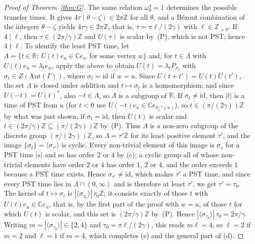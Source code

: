 \documentclass[preprint,11pt]{elsarticle}
\theoremstyle{definition}
\theoremstyle{remark}
\newcommand{\Z}{\mathbb Z}
\begin{document}
\begin{proof}[Proof of Theorem~\ref{thm:G}]
The same relation $\omega_\theta^4=1$ determines the possible transfer times. It gives $4\tau(\theta-\zeta)\in2\pi\Z$ for all $\theta$, and a B\'ezout combination of the integers $\theta-\zeta$ yields $4\tau\gamma\in2\pi\Z$, that is, $\tau=\pi\ell/(2\gamma)$ with $\ell\in\Z_{>0}$. If $4\mid\ell$, then $\tau\in(2\pi/\gamma)\Z$ and $U(\tau)$ is scalar by~(P), which is not PST; hence $4\nmid\ell$. To identify the least PST time, let $\Lambda=\{t\in\mathbb R:\ U(t)e_u\in\mathbb Ce_w\text{ for some vertex }w\}$ and, for $t\in\Lambda$ with $U(t)e_u=\lambda_te_w$, apply the above to obtain $U(t)=\lambda_tP_{\sigma_t}$ with $\sigma_t\in Z(\mathrm{Aut}(\Gamma))$, where $\sigma_t=\mathrm{id}$ if $w=u$. Since $U(t+t')=U(t)U(t')$, the set $\Lambda$ is closed under addition and $t\mapsto\sigma_t$ is a homomorphism; and since $U(-t)=U(t)^*$, also $-t\in\Lambda$, so $\Lambda$ is a subgroup of $\mathbb R$. If $\sigma_t\ne\mathrm{id}$, then $|t|$ is a time of PST from $u$ (for $t<0$ use $U(-t)e_u\in\mathbb Ce_{\sigma_t^{-1}(u)}$), so $t\in(\pi/(2\gamma))\Z$ by what was just shown; if $\sigma_t=\mathrm{id}$, then $U(t)$ is scalar and $t\in(2\pi/\gamma)\Z\subseteq(\pi/(2\gamma))\Z$ by~(P). Thus $\Lambda$ is a non-zero subgroup of the discrete group $(\pi/(2\gamma))\Z$, so $\Lambda=\tau'\Z$ for its least positive element $\tau'$, and the image $\{\sigma_t\}=\langle\sigma_{\tau'}\rangle$ is cyclic. Every non-trivial element of this image is $\sigma_s$ for a PST time $|s|$ and so has order $2$ or $4$ by (c); a cyclic group all of whose non-trivial elements have order $2$ or $4$ has order $1$, $2$ or $4$, and the order exceeds $1$ because a PST time exists. Hence $\sigma_{\tau'}\ne\mathrm{id}$, which makes $\tau'$ a PST time, and since every PST time lies in $\Lambda\cap(0,\infty)$ and is therefore at least $\tau'$, we get $\tau'=\tau_0$. The kernel of $t\mapsto\sigma_t$ is $|\langle\sigma_{\tau_0}\rangle|\,\tau_0\Z$; it consists exactly of those $t$ with $U(t)e_u\in\mathbb Ce_u$, that is, by the first part of the proof with $w=u$, of those $t$ for which $U(t)$ is scalar, and this set is $(2\pi/\gamma)\Z$ by~(P). Hence $|\langle\sigma_{\tau_0}\rangle|\,\tau_0=2\pi/\gamma$. Writing $m=|\langle\sigma_{\tau_0}\rangle|\in\{2,4\}$ and $\tau_0=\pi\ell/(2\gamma)$, this reads $m\ell=4$, so $\ell=2$ if $m=2$ and $\ell=1$ if $m=4$, which completes (e) and the general part of (d).


\end{proof}
\end{document}
